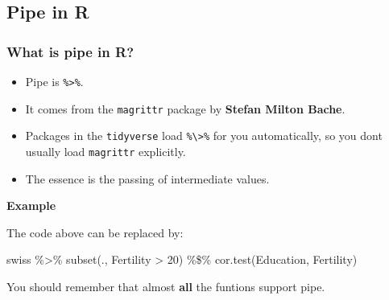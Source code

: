 \documentclass[
]{article}
\newenvironment{Shaded}{}{}
\newcommand{\DecValTok}[1]{\textcolor[rgb]{0.25,0.63,0.44}{#1}}
\newcommand{\FunctionTok}[1]{\textcolor[rgb]{0.02,0.16,0.49}{#1}}
\newcommand{\NormalTok}[1]{#1}
\newcommand{\OtherTok}[1]{\textcolor[rgb]{0.00,0.44,0.13}{#1}}
\newcommand{\SpecialCharTok}[1]{\textcolor[rgb]{0.25,0.44,0.63}{#1}}
\begin{document}
\hypertarget{pipe-in-r}{%
\subsection{Pipe in R}\label{pipe-in-r}}

\hypertarget{what-is-pipe-in-r}{%
\subsubsection{What is pipe in R?}\label{what-is-pipe-in-r}}

\begin{itemize}
\item
  Pipe is \texttt{\%\textgreater{}\%}.
\item
  It comes from the \texttt{magrittr} package by \textbf{Stefan Milton
  Bache}.
\item
  Packages in the \texttt{tidyverse} load
  \texttt{\%\textbackslash{}\textgreater{}\%} for you automatically, so
  you don\textquotesingle t usually load \texttt{magrittr} explicitly.
\item
  The essence is the passing of intermediate values.
\end{itemize}

\textbf{Example}

\begin{Shaded}
\end{Shaded}

The code above can be replaced by:

\begin{Shaded}
\begin{Highlighting}[]
\NormalTok{swiss }\SpecialCharTok{\%\textgreater{}\%}
  \FunctionTok{subset}\NormalTok{(., Fertility }\SpecialCharTok{\textgreater{}} \DecValTok{20}\NormalTok{) }\SpecialCharTok{\%\$\%}
  \FunctionTok{cor.test}\NormalTok{(Education, Fertility)}
\end{Highlighting}
\end{Shaded}

You should remember that almost \textbf{all} the funtions support pipe.
\end{document}
